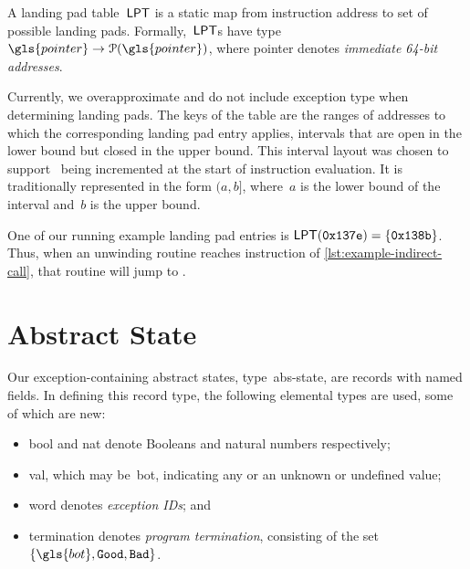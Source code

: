 \begin{definition}
  A landing pad table~$\operatorname{\mathsf{LPT}}$ is a static map from instruction address to set of possible landing pads.
  Formally,~$\operatorname{\mathsf{LPT}}$s have type $\gls{pointer}\to\powerset(\gls{pointer})$, where \gls{pointer} denotes \emph{immediate 64-bit addresses}.
\end{definition}
Currently, we overapproximate and do not include exception type when determining landing pads.
The keys of the table are the ranges of addresses to which the corresponding landing pad entry applies, intervals that are open in the lower bound but closed in the upper bound. This interval layout was chosen to support \rip\ being incremented at the start of instruction evaluation. It is traditionally represented in the form $(a,b]$, where~$a$ is the lower bound of the interval and~$b$ is the upper bound.
\begin{example}\label{ex:landing-pad-table}
  One of our running example landing pad entries is  $\operatorname{\mathsf{LPT}}(\mathtt{0x137e})=\{\mathtt{0x138b}\}$.
  Thus, when an unwinding routine reaches instruction  of \cref{lst:example-indirect-call},
  that routine will jump to .
\end{example}

\section{Abstract State}\label{sec:abstract-state}
Our exception-containing abstract states, type~\gls{abs-state}, are records with named fields.
In defining this record type, the following elemental types are used, some of which are new:
\begin{itemize} %
  \item \Gls{bool} and \gls{nat} denote Booleans and natural numbers respectively;
  \item \Gls{val},
  which may be~\gls{bot}, indicating any or an unknown or undefined value;
  \item \Gls{word} denotes \emph{exception IDs}; and
  \item \Gls{termination} denotes \emph{program termination}, consisting of the set $\{\gls{bot},\good,\bad\}$.
\end{itemize}

